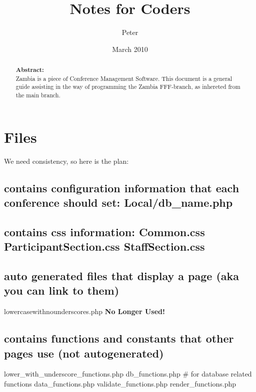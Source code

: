 \documentclass[tablesignature]{scrartcl}
\title{Notes for Coders}
\author{Peter}
\date{March 2010}
\begin{document}
\maketitle


\thispagestyle{fancy}
\renewcommand{\headrulewidth}{0pt}
\renewcommand{\footrulewidth}{1pt}
\lhead{}
\rhead{}
\chead{}
\cfoot{}
\rfoot{\thepage}
\begin{abstract}
\vspace{5cm}
{\LARGE{\textbf{Abstract:\\}}}
Zambia is a piece of Conference Management Software.  This document is a general guide assisting in the way of programming the Zambia FFF-branch, as inhereted from the main branch.
\end{abstract}
\newpage
\renewcommand{\headrulewidth}{1pt}
\tableofcontents
\listoftables
\listoffigures
\newpage
{}
\section{Files}
\label{sec-1}

We need consistency, so here is the plan:
\subsection{contains configuration information that each conference should set: Local/db\_{}name.php}
\label{sec-1_1}
\subsection{contains css information: Common.css  ParticipantSection.css  StaffSection.css}
\label{sec-1_2}
\subsection{auto generated files that display a page (aka you can link to them)}
\label{sec-1_3}

   lowercasewithnounderscores.php
   \textbf{No Longer Used!}
\subsection{contains functions and constants that other pages use (not autogenerated)}
\label{sec-1_4}

   lower\_{}with\_{}underscore\_{}functions.php
   db\_{}functions.php           \# for database related functions
   data\_{}functions.php
   validate\_{}functions.php
   render\_{}functions.php
\end{document}
